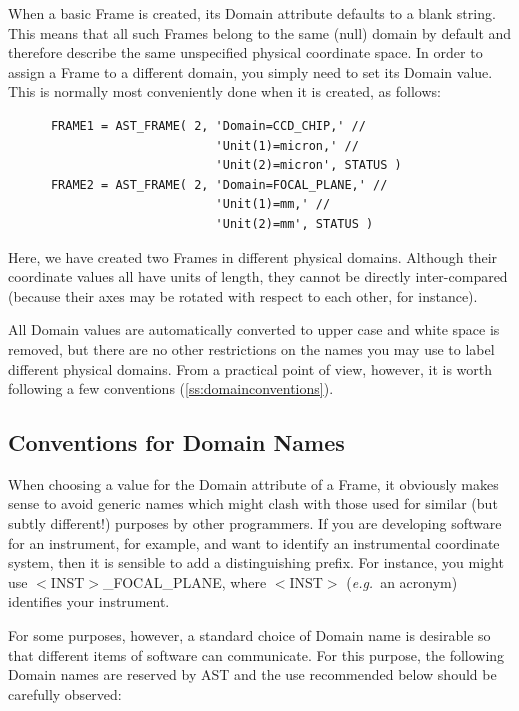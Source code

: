 \documentclass[twoside,11pt]{article}
\newcommand{\htmlref}[2]{#1}
\newcommand{\secref}[1]{\S\ref{#1}}
\renewcommand{\secref}[1]{\ref{#1}}
\begin{document}
When a basic Frame is created, its Domain attribute defaults to a
blank string. This means that all such Frames belong to the same
(null) domain by default and therefore describe the same unspecified
physical coordinate space. In order to assign a Frame to a different
domain, you simply need to set its Domain value. This is normally most
conveniently done when it is created, as follows:

\small
\begin{verbatim}
      FRAME1 = AST_FRAME( 2, 'Domain=CCD_CHIP,' //
                             'Unit(1)=micron,' //
                             'Unit(2)=micron', STATUS )
      FRAME2 = AST_FRAME( 2, 'Domain=FOCAL_PLANE,' //
                             'Unit(1)=mm,' //
                             'Unit(2)=mm', STATUS )
\end{verbatim}
\normalsize

Here, we have created two Frames in different physical
domains. Although their coordinate values all have units of length,
they cannot be directly inter-compared (because their axes may be
rotated with respect to each other, for instance).

All Domain values are automatically converted to upper case and white
space is removed, but there are no other restrictions on the names you
may use to label different physical domains. From a practical point of
view, however, it is worth following a few conventions
(\secref{ss:domainconventions}).

\subsection{\label{ss:domainconventions}Conventions for Domain Names}

When choosing a value for the \htmlref{Domain}{Domain} attribute of a \htmlref{Frame}{Frame}, it
obviously makes sense to avoid generic names which might clash with
those used for similar (but subtly different!) purposes by other
programmers. If you are developing software for an instrument, for
example, and want to identify an instrumental coordinate system, then
it is sensible to add a distinguishing prefix. For instance, you might
use $<$INST$>$\_FOCAL\_PLANE, where $<$INST$>$ ({\em{e.g.}}\ an
acronym) identifies your instrument.

For some purposes, however, a standard choice of Domain name is
desirable so that different items of software can communicate. For
this purpose, the following Domain names are reserved by AST and the
use recommended below should be carefully observed:
\end{document}
